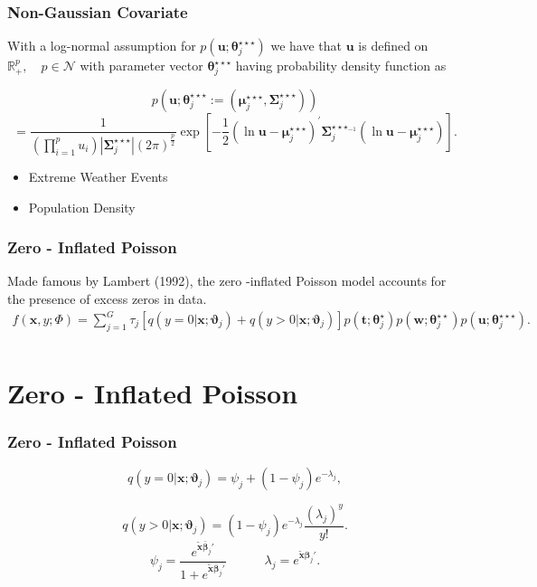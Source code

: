 \documentclass{beamer}
\begin{document}

\begin{frame}
\frametitle{Non-Gaussian Covariate}
With a log-normal assumption for $p(\bm{u};\bm{\theta}_j^{\star\star\star})$ we have that $\bm{u}$ is defined on $\mathbb{R}^p_+,\quad p \in \mathcal{N}$ with parameter vector $ \bm{\theta}_j^{\star\star\star} $ having probability density function as
\begin{small}
$$ 
p \left(  \bm{u}; \bm{\theta}_j^{\star\star\star} := ( \bm{\mu}_j^{\star\star\star} ,\bm{ \Sigma}_j^{\star\star\star } ) \right)
$$
$$ 
= \frac{1}{(\prod_{i=1}^{p}u_{i})|\bm{ \Sigma}_j^{\star\star\star} |(2 \pi)^{\frac{p}{2}}}   \exp\left[-\frac{1}{2}(\ln\bm{ u}-\bm{\mu}_j^{\star\star\star})^{'}\bm{\Sigma}_j^{{\star\star\star}_{-1}}(\ln \bm {u}-\bm{\mu}_j^{\star\star\star})\right].
$$
\begin{itemize}
\item Extreme Weather Events
\item Population Density
\end{itemize}
\end{small}
\end{frame}
\begin{frame}
\frametitle{Zero - Inflated Poisson}
\begin{small}
Made famous by Lambert (1992), the zero -inflated Poisson model accounts for the presence of excess zeros in data. 
 \begin{align*}
 f(\bm x, y; \Phi)= \sum_{j=1}^{G} \tau_j \left[ q(y = 0|\bm{x};\bm{\vartheta}_{j} ) +  q(y > 0|\bm{x} ; \bm{\vartheta}_{j}  ) \right]   p(\bm{t};\bm{\theta}_j^{\star})p(\bm{w};\bm{\theta}_j^{\star\star})p(\bm{u};\bm{\theta}_j^{\star\star\star}). \\
\end{align*}
\end{small}
\end{frame} 
\section{Zero - Inflated Poisson}
\newcommand{\xTilda}{\bm{\tilde{x}}}
\begin{frame}
\frametitle{Zero - Inflated Poisson}
$$ 
 q( y = 0| \bm{x} ; \bm{ \vartheta}_{j}  ) = \psi_j + (1 - \psi_j)e^{-\lambda_j},
$$

$$ 
q(y > 0 |  \bm{x} ; \bm{ \vartheta}_{j}  ) = (1 - \psi_j)e^{-\lambda_j} \frac{\left(\lambda_j \right)^y  }{y!}.
 $$
$$
 \psi_j =  \frac{e^{\xTilda \bm{\bar{\beta}}_j'}}{1+ e^{\xTilda \bm{\bar{\beta}}_j'}}   \quad \quad \quad
\lambda_j  = e^{\xTilda \bm{\beta}_j'}. 
$$
\end{frame} 
\end{document}
